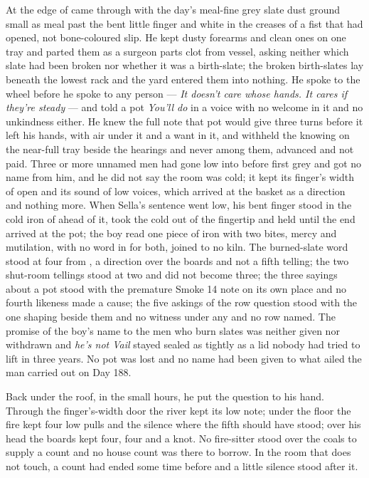 At the edge of   came through with the day's meal-fine grey slate dust ground small as meal past the bent little finger and white in the creases of a fist that had opened, not bone-coloured slip. He kept dusty forearms and clean ones on one tray and parted them as a surgeon parts clot from vessel, asking neither which slate had been broken nor whether it was a birth-slate; the broken birth-slates lay beneath the lowest rack and the yard entered them into nothing. He spoke to the wheel before he spoke to any person --- \emph{It doesn't care whose hands. It cares if they're steady} --- and told a pot \emph{You'll do} in a voice with no welcome in it and no unkindness either. He knew the full note that pot would give three turns before it left his hands, with air under it and a want in it, and withheld the knowing on the near-full tray beside the hearings and never among them, advanced and not paid. Three or more unnamed men had gone low into  before first grey and got no name from him, and he did not say the room was cold; it kept its finger's width of open and its sound of low voices, which arrived at the basket as a direction and nothing more. When Sella's sentence went low, his bent finger stood in the cold iron of  ahead of it, took the cold out of the fingertip and held until the end arrived at the pot; the boy read one piece of iron with two bites, mercy and mutilation, with no word in  for both, joined to no kiln. The burned-slate word stood at four from , a direction over the boards and not a fifth telling; the two shut-room tellings stood at two and did not become three; the three sayings about a pot stood with the premature Smoke 14 note on its own place and no fourth likeness made a cause; the five askings of the row question stood with the one shaping beside them and no witness under any and no row named. The promise of the boy's name to the men who burn slates was neither given nor withdrawn and \emph{he's not Vail} stayed sealed as tightly as a lid nobody had tried to lift in three years. No pot was lost and no name had been given to what ailed the man carried out on Day 188.

\scenebreak

Back under the roof, in the small hours, he put the question to his hand. Through the finger's-width door the river kept its low note; under the floor the fire kept four low pulls and the silence where the fifth should have stood; over his head the boards kept four, four and a knot. No fire-sitter stood over the coals to supply a count and no house count was there to borrow. In the room that does not touch, a count had ended some time before and a little silence stood after it.

